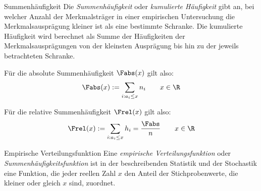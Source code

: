 \begin{defi}{Summenhäufigkeit}
    Die \emph{Summenhäufigkeit} oder \emph{kumulierte Häufigkeit} gibt an, bei welcher Anzahl der Merkmalsträger in einer empirischen Untersuchung die Merkmalsausprägung kleiner ist als eine bestimmte Schranke.
    Die kumulierte Häufigkeit wird berechnet als Summe der Häufigkeiten der Merkmalsausprägungen von der kleinsten Ausprägung bis hin zu der jeweils betrachteten Schranke.

    Für die absolute Summenhäufigkeit $\Fabs(x)$ gilt also:
    \[
        \Fabs(x) := \sum_{i: a_i \leq x} n_i \qquad x \in \R
    \]

    Für die relative Summenhäufigkeit $\Frel(x)$ gilt also:
    \[
        \Frel(x) := \sum_{i: a_i \leq x} h_i = \frac{\Fabs}{n} \qquad x \in \R
    \]
\end{defi}

\begin{defi}{Empirische Verteilungsfunktion}
    Eine \emph{empirische Verteilungsfunktion} oder \emph{Summenhäufigkeitsfunktion} ist in der beschreibenden Statistik und der Stochastik eine Funktion, die jeder reellen Zahl $x$ den Anteil der Stichprobenwerte, die kleiner oder gleich $x$ sind, zuordnet.
\end{defi}

